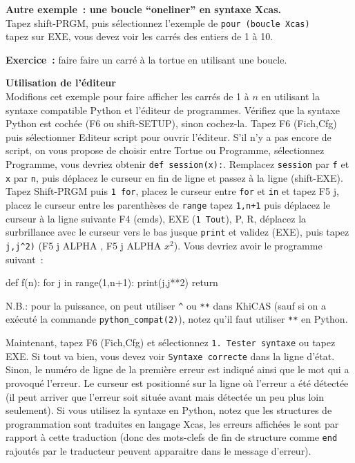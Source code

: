 \documentclass{article}
\begin{document}
\begin{giacjshere}
{\bf Autre exemple~: une boucle ``oneliner'' en syntaxe Xcas.}\\
Tapez shift-PRGM, puis s\'electionnez l'exemple
de \verb|pour (boucle Xcas)|\\
tapez sur EXE, vous devez voir les carr\'es des entiers de 1 \`a 10.

{\bf Exercice~:} faire faire un carr\'e \`a la tortue en utilisant
une boucle.

{\bf Utilisation de l'\'editeur}\\
Modifions cet exemple pour faire afficher les carr\'es de 1 \`a $n$
en utilisant la syntaxe compatible Python et
l'\'editeur de programmes. V\'erifiez que la syntaxe Python
est coch\'ee (F6 ou shift-SETUP), sinon cochez-la.
Tapez F6 (Fich,Cfg) puis s\'electionner
Editeur script
pour ouvrir l'\'editeur. S'il n'y a pas encore de script,
on vous propose de choisir entre Tortue ou Programme, s\'electionnez
Programme, vous devriez obtenir
\verb|def session(x):|. Remplacez \verb|session| par \verb|f| et
\verb|x| par \verb|n|, puis 
d\'eplacez le curseur en fin de ligne et passez \`a la
ligne (shift-EXE).
Tapez Shift-PRGM puis \verb|1 for|, placez le curseur entre \verb|for|
et \verb|in| et tapez F5 j, placez le curseur entre les parenth\`eses
de \verb|range| tapez \verb|1,n+1| puis
d\'eplacez le curseur \`a la ligne suivante
F4 (cmds), EXE (\verb|1 Tout|), P, R, d\'eplacez
la surbrillance avec le curseur vers le bas jusque \verb|print| 
et validez (EXE), puis tapez \verb|j,j^2)| (F5 j ALPHA , F5 j ALPHA $x^2$). 
Vous devriez avoir le  programme suivant~:
\begin{giacprog}
def f(n):
  for j in range(1,n+1):
    print(j,j**2)
  return 
\end{giacprog}
N.B.: pour la puissance, on peut utiliser \verb|^| ou \verb|**| dans 
KhiCAS (sauf si on a ex\'ecut\'e la commande \verb|python_compat(2)|),
notez qu'il faut utiliser \verb|**| en Python.

Maintenant, tapez F6 (Fich,Cfg) et s\'electionnez \verb|1. Tester syntaxe|
ou tapez EXE.
Si tout va bien, vous devez voir \verb|Syntaxe correcte| 
dans la ligne d'\'etat.
Sinon, le num\'ero de ligne de la premi\`ere erreur est indiqu\'e ainsi que
le mot qui a provoqu\'e l'erreur. Le curseur est positionn\'e sur la ligne
o\`u l'erreur a \'et\'e d\'etect\'ee (il peut arriver que l'erreur soit 
situ\'ee avant mais d\'etect\'ee un peu plus loin seulement). Si vous
utilisez la syntaxe en Python, notez que les structures de programmation
sont traduites en langage Xcas, les erreurs affich\'ees le sont par
rapport \`a cette traduction (donc des mots-clefs de fin de structure
comme \verb|end| rajout\'es par le traducteur
peuvent apparaitre dans le message d'erreur).


\end{giacjshere}
\end{document}
